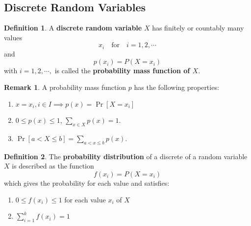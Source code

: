 \documentclass[12pt,openany]{book}
\theoremstyle{definition}
\newtheorem{definition}{Definition}[chapter]
\newtheorem{remark}{Remark}[chapter]
\newcommand{\dispsty}{\displaystyle}
\begin{document}
	\subsection{Discrete Random Variables}
	\begin{tcolorbox}[colback=white,colframe=defcolor,arc=5pt,title={\color{white}\bf Discrete Random Variable}]
	\begin{definition}
		A \textbf{discrete random variable} $X$ has finitely or countably many values $$
		x_i\quad\text{for}\quad i=1,2,\cdots
		$$ and $$p(x_i)=P(X=x_i)$$ with $i=1,2,\cdots,$ is called the \textbf{probability mass function of $X$}.
	\end{definition}
\end{tcolorbox}
	\begin{remark}
		A probability mass function $p$ has the following properties:\begin{enumerate}[(1)]
			\item $x=x_i, i\in I\implies p(x)=\Pr[X=x_i]$
			\item $0\leq p(x)\leq 1$, $\sum_{x\in X}p(x)=1$.
			\item $\Pr[a<X\leq b]=\sum_{a<x\leq b}p(x)$.
		\end{enumerate}
	\end{remark}
	\vspace{10pt}
	\begin{tcolorbox}[colback=white,colframe=defcolor,arc=5pt,title={\color{white}\bf Discrete Probability Distribution}]
		\begin{definition}
			The \textbf{probability distribution} of a discrete of a random variable $X$ is described as the function \[
			f(x_i) = P(X=x_i)
			\] which gives the probability for each value and satisfies: \begin{enumerate}
				\item $0\leq f(x_i)\leq 1$ for each value $x_i$ of $X$
				\item \(\dispsty\sum_{i=1}^kf(x_i)=1 \)
			\end{enumerate}
		\end{definition}
	\end{tcolorbox}
\end{document}
